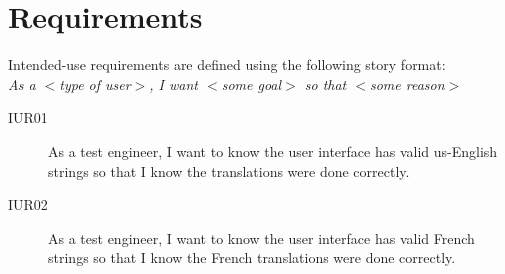 \newpage
\section{Requirements}
Intended-use requirements are defined using the following story format: \\
\hspace*{1.5cm}\emph{As a $<$type of user$>$, I want $<$some goal$>$ so that $<$some reason$>$}

\begin{description}

\item[IUR01] \quad
As a test engineer, I want to know the user interface has valid us-English
strings so that I know the translations were done correctly.

\item[IUR02] \quad
As a test engineer, I want to know the user interface has valid French strings
so that I know the French translations were done correctly. 

\end{description}
